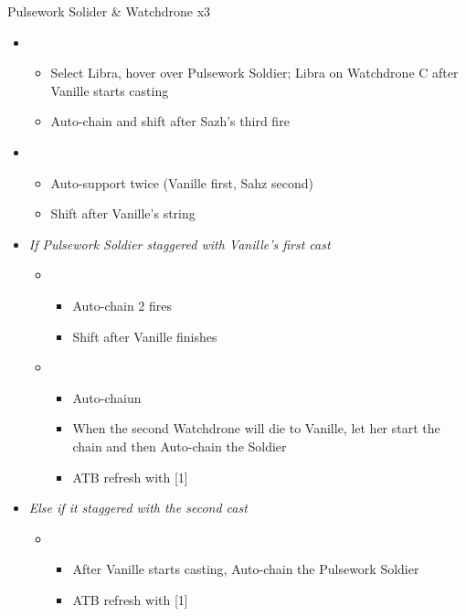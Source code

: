 \documentclass{report}
\begin{document}
\begin{battle}{Pulsework Solider \& Watchdrone x3}
\begin{itemize}
    \item \fourth
    \begin{itemize}
        \item Select Libra, hover over Pulsework Soldier; Libra on Watchdrone C after Vanille starts casting
        \item Auto-chain and shift after Sazh's third fire
    \end{itemize}
    \item \second
    \begin{itemize}
        \item Auto-support twice (Vanille first, Sahz second)
        \item Shift after Vanille's string
    \end{itemize}
    \item \textit{If Pulsework Soldier staggered with Vanille's first cast}
    \begin{itemize}
        \item \first
        \begin{itemize}
            \item Auto-chain 2 fires
            \item Shift after Vanille finishes
        \end{itemize}
        \item \fifth
        \begin{itemize}
            \item Auto-chaiun
            \item When the second Watchdrone will die to Vanille, let her start the chain and then Auto-chain the Soldier
            \item ATB refresh with [1]
        \end{itemize}
    \end{itemize}
    \item \textit{Else if it staggered with the second cast}
    \begin{itemize}
        \item \first
        \begin{itemize}
            \item After Vanille starts casting, Auto-chain the Pulsework Soldier
            \item ATB refresh with [1]
        \end{itemize}
    \end{itemize}
\end{itemize}
\end{battle}
\end{document}
